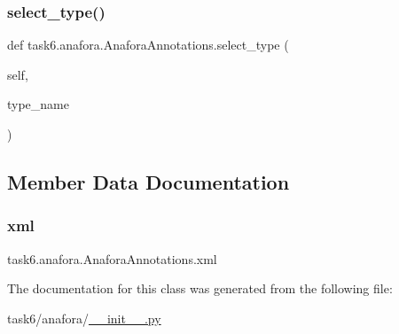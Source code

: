 \subsubsection{\texorpdfstring{select\+\_\+type()}{select\_type()}}
{\footnotesize\ttfamily def task6.\+anafora.\+Anafora\+Annotations.\+select\+\_\+type (\begin{DoxyParamCaption}\item[{}]{self,  }\item[{}]{type\+\_\+name }\end{DoxyParamCaption})}



\subsection{Member Data Documentation}
\mbox{\label{classtask6_1_1anafora_1_1AnaforaAnnotations_a19e9dbf93b6e008cbca014d56f56c3c8}} 
\subsubsection{\texorpdfstring{xml}{xml}}
{\footnotesize\ttfamily task6.\+anafora.\+Anafora\+Annotations.\+xml}



The documentation for this class was generated from the following file\+:\begin{DoxyCompactItemize}
\item 
task6/anafora/\hyperlink{task6_2anafora_2____init_____8py}{\+\_\+\+\_\+init\+\_\+\+\_\+.\+py}\end{DoxyCompactItemize}
